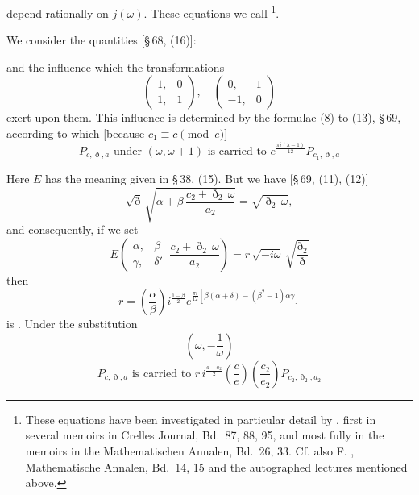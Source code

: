 depend rationally on $j(\omega)$. These equations we call
\footnote{These equations have been investigated in particular detail by , first in several memoirs in Crelles Journal, Bd.~87, 88, 95, and most fully in the memoirs in the Mathematischen Annalen, Bd.~26, 33. Cf. also F. , Mathematische Annalen, Bd.~14, 15 and the autographed lectures mentioned above.}.

We consider the quantities [§\,68, (16)]:


and the influence which the transformations
\[
\begin{pmatrix} 1, & 0 \\ 1, & 1 \end{pmatrix}, \quad
\begin{pmatrix} 0, & 1 \\ -1, & 0 \end{pmatrix}
\]
exert upon them. This influence is determined by the formulae
(8) to (13), §\,69, according to which [because $c_1 \equiv c \pmod{e}$]
\[
P_{c,\eth,a} \text{ under } (\omega, \omega+1) \text{ is carried to } e^{\frac{\pi i(\lambda-1)}{12}} P_{c_1,\eth,a}
\]


Here $E$ has the meaning given in §\,38, (15).
But we have [§\,69, (11), (12)]
\[
\sqrt{\eth}\,\sqrt{\alpha+\beta\,\frac{c_2+\eth_2\,\omega}{a_2}} = \sqrt{\eth_2\,\omega},
\]
and consequently, if we set
\[
E\!\left(\begin{matrix}\alpha, & \beta \\ \gamma, & \delta' \end{matrix}\ \frac{c_2+\eth_2\,\omega}{a_2}\right) = r\,\sqrt{-i\omega}\,\sqrt{\frac{\eth_2}{\eth}}
\]
then
\[
r = \left(\frac{\alpha}{\beta}\right) i^{\frac{1-\beta}{2}} e^{\frac{\pi i}{12}\left[\beta(\alpha+\delta)-(\beta^2-1)\alpha\gamma\right]}
\]
is . Under the substitution
\[
\left(\omega, -\frac{1}{\omega}\right)
\]
\[
P_{c,\eth,a} \text{ is carried to } r\,i^{\frac{a-a_2}{2}}\left(\frac{c}{e}\right)\left(\frac{c_2}{e_2}\right) P_{c_2,\eth_2,a_2}
\]
